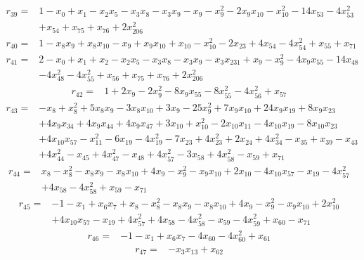 \[\begin{aligned}
r_{39}={}&1-x_{0}+x_{1}-x_{2}x_{5}-x_{3}x_{8}-x_{3}x_{9}-x_{9}-x_{9}^{2}-2x_{9}x_{10}-x_{10}^{2}-14x_{53}-4x_{53}^{2}
\\ &+x_{54}+x_{75}+x_{76}+2x_{206}^{2}
\end{aligned}\]
\[\begin{aligned}
r_{40}={}&1-x_{8}x_{9}+x_{8}x_{10}-x_{9}+x_{9}x_{10}+x_{10}-x_{10}^{2}-2x_{23}+4x_{54}-4x_{54}^{2}+x_{55}+x_{71}
\end{aligned}\]
\[\begin{aligned}
r_{41}={}&2-x_{0}+x_{1}+x_{2}-x_{2}x_{5}-x_{3}x_{8}-x_{3}x_{9}-x_{3}x_{231}+x_{9}-x_{9}^{2}-4x_{9}x_{55}-14x_{48}
\\ &-4x_{48}^{2}-4x_{55}^{2}+x_{56}+x_{75}+x_{76}+2x_{206}^{2}
\end{aligned}\]
\[\begin{aligned}
r_{42}={}&1+2x_{9}-2x_{9}^{2}-8x_{9}x_{55}-8x_{55}^{2}-4x_{56}^{2}+x_{57}
\end{aligned}\]
\[\begin{aligned}
r_{43}={}&-x_{8}+x_{8}^{2}+5x_{8}x_{9}-3x_{8}x_{10}+3x_{9}-25x_{9}^{2}+7x_{9}x_{10}+24x_{9}x_{19}+8x_{9}x_{23}
\\ &+4x_{9}x_{34}+4x_{9}x_{44}+4x_{9}x_{47}+3x_{10}+x_{10}^{2}-2x_{10}x_{11}-4x_{10}x_{19}-8x_{10}x_{23}
\\ &+4x_{10}x_{57}-x_{11}^{2}-6x_{19}-4x_{19}^{2}-7x_{23}+4x_{23}^{2}+2x_{24}+4x_{34}^{2}-x_{35}+x_{39}-x_{43}
\\ &+4x_{44}^{2}-x_{45}+4x_{47}^{2}-x_{48}+4x_{57}^{2}-3x_{58}+4x_{58}^{2}-x_{59}+x_{71}
\end{aligned}\]
\[\begin{aligned}
r_{44}={}&x_{8}-x_{8}^{2}-x_{8}x_{9}-x_{8}x_{10}+4x_{9}-x_{9}^{2}-x_{9}x_{10}+2x_{10}-4x_{10}x_{57}-x_{19}-4x_{57}^{2}
\\ &+4x_{58}-4x_{58}^{2}+x_{59}-x_{71}
\end{aligned}\]
\[\begin{aligned}
r_{45}={}&-1-x_{1}+x_{6}x_{7}+x_{8}-x_{8}^{2}-x_{8}x_{9}-x_{8}x_{10}+4x_{9}-x_{9}^{2}-x_{9}x_{10}+2x_{10}^{2}
\\ &+4x_{10}x_{57}-x_{19}+4x_{57}^{2}+4x_{58}-4x_{58}^{2}-x_{59}-4x_{59}^{2}+x_{60}-x_{71}
\end{aligned}\]
\[\begin{aligned}
r_{46}={}&-1-x_{1}+x_{6}x_{7}-4x_{60}-4x_{60}^{2}+x_{61}
\end{aligned}\]
\[\begin{aligned}
r_{47}={}&-x_{3}x_{13}+x_{62}
\end{aligned}\]
